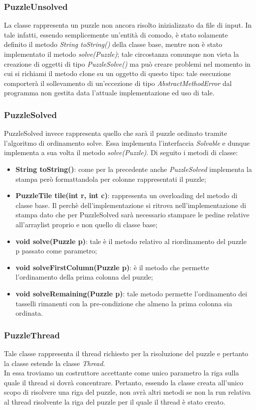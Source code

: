 \documentclass[11pt]{article}
\begin{document}
\subsubsection{PuzzleUnsolved}
La classe rappresenta un puzzle non ancora risolto inizializzato da file di input. In tale infatti, essendo semplicemente un'entità di comodo, è stato solamente definito il metodo \textit{String toString()} della classe base, mentre non è stato implementato il metodo \textit{solve(Puzzle)}; tale circostanza comunque non vieta la creazione di oggetti di tipo \textit{PuzzleSolve()} ma può creare problemi nel momento in cui si richiami il metodo clone su un oggetto di questo tipo: tale esecuzione comporterà il sollevamento di un'eccezione di tipo \textit{AbstractMethodError} dal programma non gestita data l'attuale implementazione ed uso di tale.
\subsubsection{PuzzleSolved}
PuzzleSolved invece rappresenta quello che sarà il puzzle ordinato tramite l'algoritmo di ordinamento solve. Essa implementa l'interfaccia \textit{Solvable} e dunque implementa a sua volta il metodo \textit{solve(Puzzle)}.
Di seguito i metodi di classe:
\begin{itemize}
    \item \textbf{String toString()}: come per la precedente anche \textit{PuzzleSolved} implementa la stampa però formattandola per colonne rappresentati il puzzle;
    \item \textbf{PuzzleTile tile(int r, int c)}: rappresenta un overloading del metodo di classe base. Il perchè dell'implementazione si ritrova nell'implementazione di stampa dato che per PuzzleSolved sarà necessario stampare le pedine relative all'arraylist proprio e non quello di classe base;
    \item \textbf{void solve(Puzzle p)}: tale è il metodo relativo al riordinamento del puzzle p passato come parametro;
    \item \textbf{void solveFirstColumn(Puzzle p)}: è il metodo che permette l'ordinamento della prima colonna del puzzle;
    \item \textbf{void solveRemaining(Puzzle p)}: tale metodo permette l'ordinamento dei tasselli rimanenti con la pre-condizione che almeno la prima colonna sia ordinata.
\end{itemize}
\subsubsection{PuzzleThread}
Tale classe rappresenta il thread richiesto per la risoluzione del puzzle e pertanto la classe estende la classe \textit{Thread}.\\
In essa troviamo un costruttore accettante come unico parametro la riga sulla quale il thread si dovrà concentrare.
Pertanto, essendo la classe creata all'unico scopo di risolvere una riga del puzzle, non avrà altri metodi se non la run relativa al thread risolvente la riga del puzzle per il quale il thread è stato creato.
\end{document}
